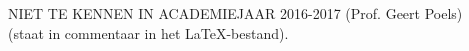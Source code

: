 \documentclass{article}
\begin{document}
NIET TE KENNEN IN ACADEMIEJAAR 2016-2017 (Prof. Geert Poels)\\
(staat in commentaar in het \LaTeX-bestand).

\end{document}
